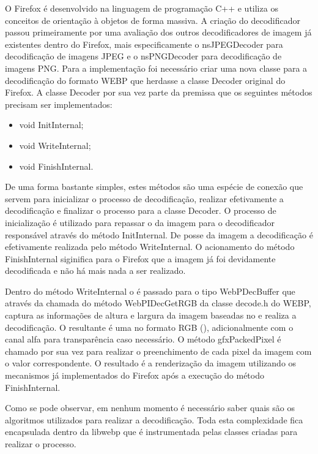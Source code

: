 \documentclass[espaco=simples,appendix=Name]{abnt}
\begin{document}
O Firefox é desenvolvido na linguagem de programação C++ e utiliza os conceitos de orientação à objetos de forma massiva. A criação do decodificador passou primeiramente por uma avaliação dos outros decodificadores de imagem já existentes dentro do Firefox, mais especificamente o nsJPEGDecoder para decodificação de imagens JPEG e o nsPNGDecoder para decodificação de imagens PNG. Para a implementação foi necessário criar uma nova classe para a decodificação do formato WEBP que herdasse a classe Decoder original do Firefox. A classe Decoder por sua vez parte da premissa que os seguintes métodos precisam ser implementados:

\begin{itemize}
        \item void InitInternal;
        \item void WriteInternal;
        \item void FinishInternal.
\end{itemize}

De uma forma bastante simples, estes métodos são uma espécie de conexão que servem para inicializar o processo de decodificação, realizar efetivamente a decodificação e finalizar o processo para a classe Decoder. O processo de inicialização é utilizado para repassar o  da imagem para o decodificador responsável através do método InitInternal. De posse da imagem a decodificação é efetivamente realizada pelo método WriteInternal. O acionamento do método FinishInternal siginifica para o Firefox que a imagem já foi devidamente decodificada e não há mais nada a ser realizado.

Dentro do método WriteInternal o  é passado para o tipo WebPDecBuffer que através da chamada do método WebPIDecGetRGB da classe decode.h do WEBP, captura as informações de altura e largura da imagem baseadas no  e realiza a decodificação. O  resultante é uma  no formato RGB (), adicionalmente com o canal alfa para transparência caso necessário. O método gfxPackedPixel é chamado por sua vez para realizar o preenchimento de cada pixel da imagem com o valor correspondente. O resultado é a renderização da imagem utilizando os mecanismos já implementados do Firefox após a execução do método FinishInternal.

Como se pode observar, em nenhum momento é necessário saber quais são os algoritmos utilizados para realizar a decodificação. Toda esta complexidade fica encapsulada dentro da libwebp que é instrumentada pelas classes criadas para realizar o processo.
\end{document}
